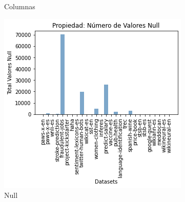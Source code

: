 \begin{figure}
\begin{minipage}[b]{0.31\textwidth}
        \caption{Columnas}
        \label{fig:columns}
  \end{minipage}      
\hspace{0.01cm}
  \begin{minipage}[b]{0.31\textwidth}
    \centering
      \includegraphics[width=\textwidth]{Graphics/results/null_values.png}
        \caption{Null}
        \label{fig:null}
    \end{minipage} 
\end{figure}


